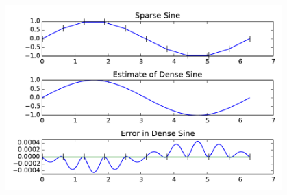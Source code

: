 \begin{minipage}[c]{\textwidth}\centering\includegraphics[width=0.8\textwidth]{./pyJvsip_examples/eXspline}
\label{fig:SplineExample}\end{minipage}
